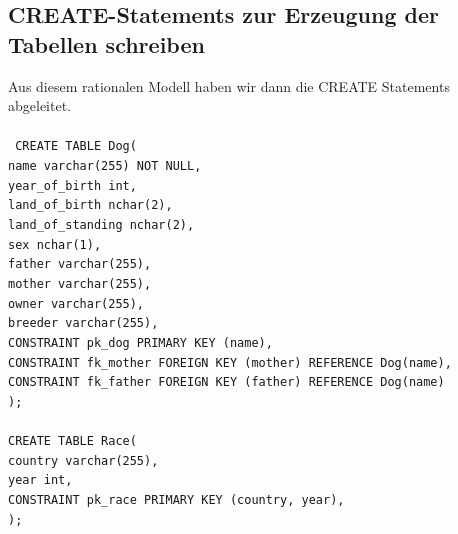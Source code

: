 \documentclass[10pt,a4paper]{article}
\begin{document}
	\subsection{CREATE-Statements zur Erzeugung der Tabellen schreiben}
		Aus diesem rationalen Modell haben wir dann die CREATE Statements abgeleitet.
		\\ \\
		\texttt{	
			CREATE TABLE Dog(\\
				\hspace*{4mm}	name varchar(255) NOT NULL,\\
				\hspace*{4mm}	year\_of\_birth int,\\
				\hspace*{4mm}	land\_of\_birth nchar(2),\\
				\hspace*{4mm}	land\_of\_standing nchar(2),\\
				\hspace*{4mm}	sex nchar(1),\\
				\hspace*{4mm}	father varchar(255),\\
				\hspace*{4mm}	mother varchar(255),\\
				\hspace*{4mm}	owner varchar(255),\\
				\hspace*{4mm}	breeder varchar(255),\\
				\hspace*{4mm}	CONSTRAINT pk\_dog PRIMARY KEY (name),\\
				\hspace*{4mm}	CONSTRAINT fk\_mother FOREIGN KEY (mother) REFERENCE Dog(name),\\
				\hspace*{4mm}	CONSTRAINT fk\_father FOREIGN KEY (father) REFERENCE Dog(name)\\
			);\\ \\
			CREATE TABLE Race(\\
				\hspace*{4mm}	country varchar(255),\\
				\hspace*{4mm}	year int,\\
				\hspace*{4mm}	CONSTRAINT pk\_race PRIMARY KEY (country, year),\\
			);\\ \\
}
\end{document}
